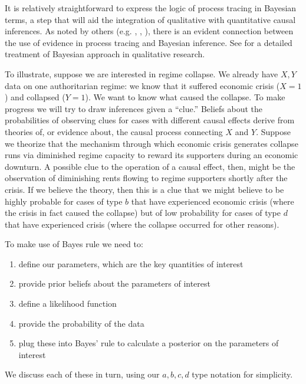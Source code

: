 \documentclass[
  12pt,
]{book}
\providecommand{\tightlist}{%
  \setlength{\itemsep}{0pt}\setlength{\parskip}{0pt}}
\begin{document}
It is relatively straightforward to express the logic of process tracing in Bayesian terms, a step that will aid the integration of qualitative with quantitative causal inferences. As noted by others (e.g. \citet{BennettBayes}, \citet{beachpedersen2013process}, \citet{rohlfing2012case}), there is an evident connection between the use of evidence in process tracing and Bayesian inference. See \citet{fairfield2017explicit} for a detailed treatment of Bayesian approach in qualitative research.

To illustrate, suppose we are interested in regime collapse. We already have \(X,Y\) data on one authoritarian regime: we know that it suffered economic crisis (\(X=1\)) and collapsed (\(Y=1\)). We want to know what caused the collapse. To make progress we will try to draw inferences given a ``clue.'' Beliefs about the probabilities of observing clues for cases with different causal effects derive from theories of, or evidence about, the causal process connecting \(X\) and \(Y\). Suppose we theorize that the mechanism through which economic crisis generates collapse runs via diminished regime capacity to reward its supporters during an economic downturn. A possible clue to the operation of a causal effect, then, might be the observation of diminishing rents flowing to regime supporters shortly after the crisis. If we believe the theory, then this is a clue that we might believe to be highly probable for cases of type \(b\) that have experienced economic crisis (where the crisis in fact caused the collapse) but of low probability for cases of type \(d\) that have experienced crisis (where the collapse occurred for other reasons).

To make use of Bayes rule we need to:

\begin{enumerate}
\def\labelenumi{\arabic{enumi}.}
\tightlist
\item
  define our parameters, which are the key quantities of interest
\item
  provide prior beliefs about the parameters of interest
\item
  define a likelihood function
\item
  provide the probability of the data
\item
  plug these into Bayes' rule to calculate a posterior on the parameters of interest
\end{enumerate}

We discuss each of these in turn, using our \(a, b, c, d\) type notation for simplicity.
\end{document}
